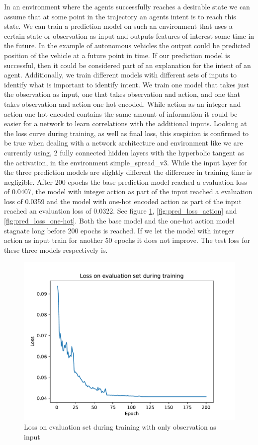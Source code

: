 \documentclass[UKenglish]{uiomasterthesis}
\begin{document}
In an environment where the agents successfully reaches a desirable state we can assume that at some point in the trajectory an agents intent is to reach this state. We can train a prediction model on such an environment that uses a certain state or observation as input and outputs features of interest some time in the future. In the example of autonomous vehicles the output could be predicted position of the vehicle at a future point in time. If our prediction model is successful, then it could be considered part of an explanation for the intent of an agent.
Additionally, we train different models with different sets of inputs to identify what is important to identify intent. We train one model that takes just the observation as input, one that takes observation and action, and one that takes observation and action one hot encoded. While action as an integer and action one hot encoded contains the same amount of information it could be easier for a network to learn correlations with the additional inputs. Looking at the loss curve during training, as well as final loss, this suspicion is confirmed to be true when dealing with a network architecture and environment like we are currently using, 2 fully connected hidden layers with the hyperbolic tangent as the activation, in the environment simple\_spread\_v3. While the input layer for the three prediction models are slightly different the difference in training time is negligible. 
After 200 epochs the base prediction model reached a evaluation loss of 0.0407, the model with integer action as part of the input reached a evaluation loss of 0.0359 and the model with one-hot encoded action as part of the input reached an evaluation loss of 0.0322. See figure \ref{fig:pred_loss_none}, \ref{fig:pred_loss_action} and \ref{fig:pred_loss_one-hot}. Both the base model and the one-hot action model stagnate long before 200 epochs is reached. If we let the model with integer action as input train for another 50 epochs it does not improve. The test loss for these three models respectively is.


\begin{figure}[!ht]
	\includegraphics[width=\columnwidth]{images/pred_model_none.pdf}
	\caption{Loss on evaluation set during training with only observation as input}
	\label{fig:pred_loss_none} 
\end{figure}
\end{document}
